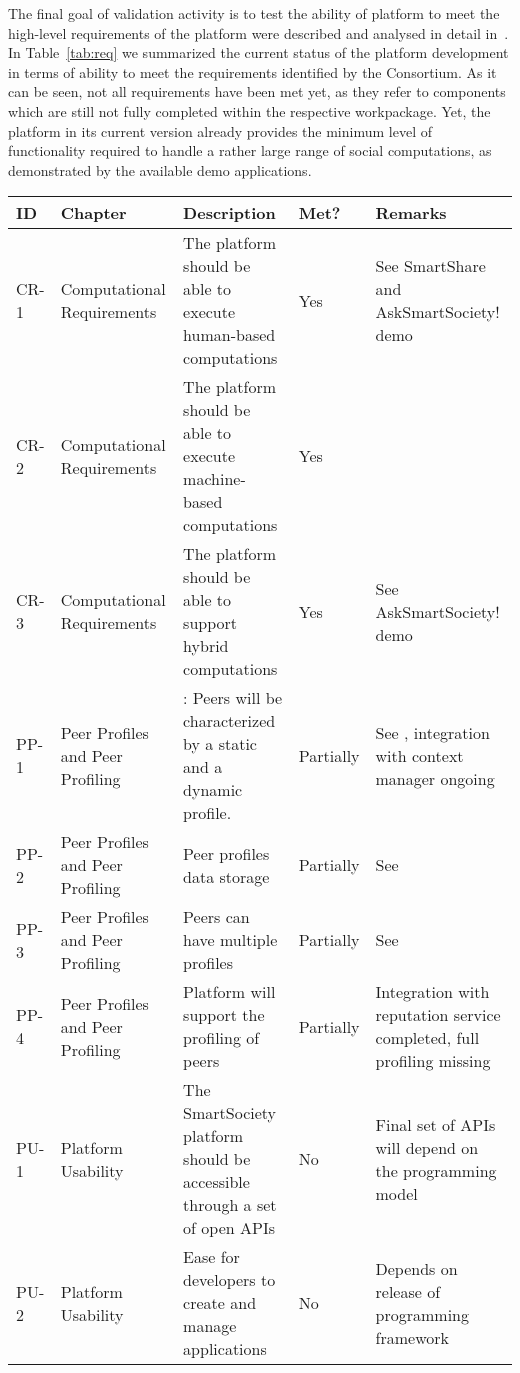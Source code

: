 
The final goal of validation activity is to test the ability of platform to meet the high-level requirements of the platform were described and analysed in detail in~\cite{D8.1}. In Table~\ref{tab:req} we summarized the current status of the platform development in terms of ability to meet the requirements identified by the Consortium. As it can be seen, not all requirements have been met yet, as they refer to components which are still not fully completed within the respective workpackage. Yet, the platform in its current version already provides the minimum level of functionality required to handle a rather large range of social computations, as demonstrated by the available demo applications.

\begin{sidewaystable}
{\footnotesize \begin{tabular}{|p{1.2cm}|p{4cm}|p{6.5cm}|p{1.8cm}|p{5.4cm}|}
\hline \hline
ID & Chapter & Description & Met? & Remarks \\
\hline \hline
CR-1 & Computational Requirements & The platform should be able to execute human-based computations & Yes & See SmartShare and AskSmartSociety! demo\\  \hline
CR-2 & Computational Requirements & The platform should be able to execute machine-based computations & Yes & \\ \hline
CR-3 & Computational Requirements & The platform should be able to support hybrid computations & Yes & See AskSmartSociety! demo\\ \hline
PP-1 & Peer Profiles and Peer Profiling &: Peers will be characterized by a static and a dynamic profile. & Partially & See \cite{D4.1,D4.2}, integration with context manager ongoing\\ \hline
PP-2 & Peer Profiles and Peer Profiling & Peer profiles data storage & Partially & See \cite{D4.2,D4.3} \\ \hline
PP-3 & Peer Profiles and Peer Profiling & Peers can have multiple profiles & Partially & See \cite{D4.2,D4.3}\\ \hline
PP-4 &Peer Profiles and Peer Profiling  & Platform will support the profiling of peers & Partially & Integration with reputation service completed, full profiling missing\\ \hline
PU-1 & Platform Usability & The SmartSociety platform should be accessible through a set of open APIs & No & Final set of APIs will depend on the programming model~\cite{D7.2} \\ \hline
PU-2 & Platform Usability & Ease for developers to create and manage applications & No & Depends on release of programming framework\\ \hline

\end{tabular}}
\end{sidewaystable}
